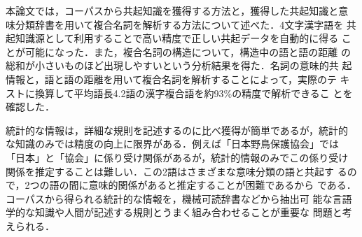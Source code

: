 本論文では，コーパスから共起知識を獲得する方法と，獲得した共起知識と意
味分類辞書を用いて複合名詞を解析する方法について述べた．4文字漢字語を
共起知識源として利用することで高い精度で正しい共起データを自動的に得る
ことが可能になった．また，複合名詞の構造について，構造中の語と語の距離
の総和が小さいものほど出現しやすいという分析結果を得た．名詞の意味的共
起情報と，語と語の距離を用いて複合名詞を解析することによって，実際のテ
キストに換算して平均語長4.2語の漢字複合語を約93\%の精度で解析できるこ
とを確認した．

統計的な情報は，詳細な規則を記述するのに比べ獲得が簡単であるが，統計的
な知識のみでは精度の向上に限界がある．例えば「日本野鳥保護協会」では
「日本」と「協会」に係り受け関係があるが，統計的情報のみでこの係り受け
関係を推定することは難しい．この2語はさまざまな意味分類の語と共起す
るので，2つの語の間に意味的関係があると推定することが困難であるから
である．コーパスから得られる統計的な情報を，機械可読辞書などから抽出可
能な言語学的な知識や人間が記述する規則とうまく組み合わせることが重要な
問題と考えられる．

